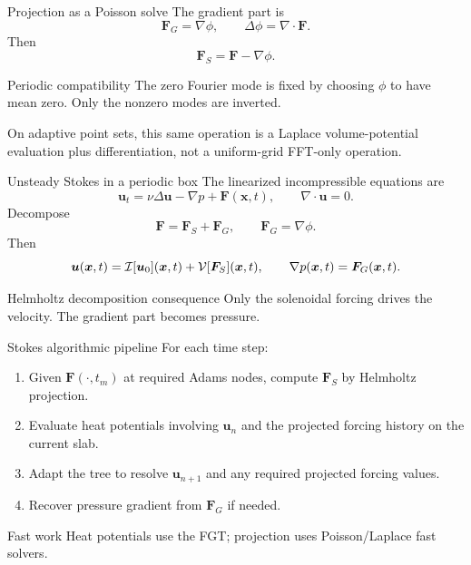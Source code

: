 \documentclass[aspectratio=169,10pt]{beamer}
\newcommand{\x}{\bm{x}}
\newcommand{\uvec}{\bm{u}}
\newcommand{\F}{\bm{F}}
\begin{document}
\begin{frame}{Projection as a Poisson solve}
\small
The gradient part is
\[
  \F_G=\nabla\phi,\qquad \Delta\phi=\nabla\cdot\F.
\]
Then
\[
  \F_S=\F-\nabla\phi.
\]

\begin{block}{Periodic compatibility}
The zero Fourier mode is fixed by choosing $\phi$ to have mean zero.
Only the nonzero modes are inverted.
\end{block}

On adaptive point sets, this same operation is a Laplace volume-potential
evaluation plus differentiation, not a uniform-grid FFT-only operation.
\end{frame}

\begin{frame}{Unsteady Stokes in a periodic box}
\small
The linearized incompressible equations are
\[
  \uvec_t=\nu\Delta\uvec-\nabla p+\F(\x,t),
  \qquad
  \nabla\cdot\uvec=0.
\]
Decompose
\[
  \F=\F_S+\F_G,\qquad \F_G=\nabla\phi.
\]
Then
\[
  \uvec(\x,t)=\Iop[\uvec_0](\x,t)+\Vop[\F_S](\x,t),
  \qquad
  \nabla p(\x,t)=\F_G(\x,t).
\]

\begin{block}{Helmholtz decomposition consequence}
Only the solenoidal forcing drives the velocity. The gradient part becomes
pressure.
\end{block}
\end{frame}

\begin{frame}{Stokes algorithmic pipeline}
\small
For each time step:
\begin{enumerate}
  \item Given $\F(\cdot,t_m)$ at required Adams nodes, compute $\F_S$ by
  Helmholtz projection.
  \item Evaluate heat potentials involving $\uvec_n$ and the projected
  forcing history on the current slab.
  \item Adapt the tree to resolve $\uvec_{n+1}$ and any required projected
  forcing values.
  \item Recover pressure gradient from $\F_G$ if needed.
\end{enumerate}

\begin{block}{Fast work}
Heat potentials use the FGT; projection uses Poisson/Laplace fast solvers.
\end{block}
\end{frame}
\end{document}
